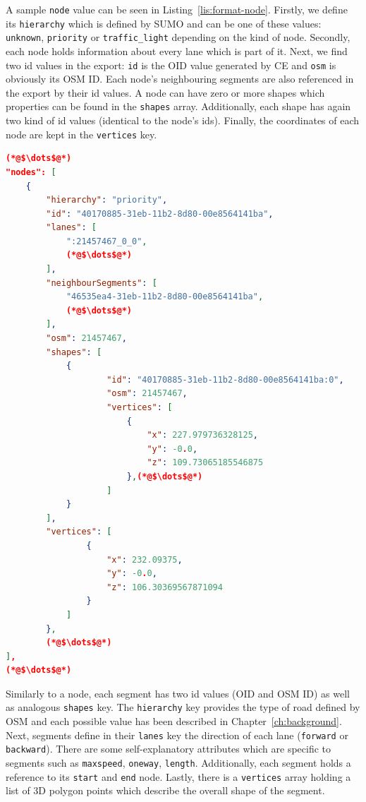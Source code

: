 A sample \texttt{node} value can be seen in Listing~\ref{lis:format-node}. Firstly, we define its \texttt{hierarchy} which is defined by SUMO and can be one of these values: \texttt{unknown}, \texttt{priority} or \texttt{traffic\_light} depending on the kind of node. Secondly, each node holds information about every lane which is part of it. Next, we find two id values in the export: \texttt{id} is the OID value generated by CE and \texttt{osm} is obviously its OSM ID. Each node's neighbouring segments are also referenced in the export by their id values. A node can have zero or more shapes which properties can be found in the \texttt{shapes} array. Additionally, each shape has again two kind of id values (identical to the node's ids). Finally, the coordinates of each node are kept in the \texttt{vertices} key.\\
 	
    \begin{scriptsize}
        \begin{lstlisting}[language=json,firstnumber=1,caption={General overview of the node key in the JSON exportformat.},label={lis:format-node}]
(*@$\dots$@*)
"nodes": [
    {
        "hierarchy": "priority",
        "id": "40170885-31eb-11b2-8d80-00e8564141ba",
        "lanes": [
            ":21457467_0_0",
            (*@$\dots$@*)
        ],
        "neighbourSegments": [
            "46535ea4-31eb-11b2-8d80-00e8564141ba",
            (*@$\dots$@*)
        ],
        "osm": 21457467,
        "shapes": [
            {
                    "id": "40170885-31eb-11b2-8d80-00e8564141ba:0",
                    "osm": 21457467,
                    "vertices": [
                        {
                            "x": 227.979736328125,
                            "y": -0.0,
                            "z": 109.73065185546875
                        },(*@$\dots$@*)
                    ]
            }
        ],
        "vertices": [
                {
                    "x": 232.09375,
                    "y": -0.0,
                    "z": 106.30369567871094
                }
            ]
        },
        (*@$\dots$@*)
],
(*@$\dots$@*)
	   \end{lstlisting}
    \end{scriptsize}
    
Similarly to a node, each segment has two id values (OID and OSM ID) as well as analogous \texttt{shapes} key. The \texttt{hierarchy} key provides the type of road defined by OSM and each possible value has been described in Chapter~\ref{ch:background}. Next, segments define in their \texttt{lanes} key the direction of each lane (\texttt{forward} or \texttt{backward}). There are some self-explanatory attributes which are specific to segments such as \texttt{maxspeed}, \texttt{oneway}, \texttt{length}. Additionally, each segment holds a reference to its \texttt{start} and \texttt{end} node. Lastly, there is a \texttt{vertices} array holding a list of 3D polygon points which describe the overall shape of the segment.\\

